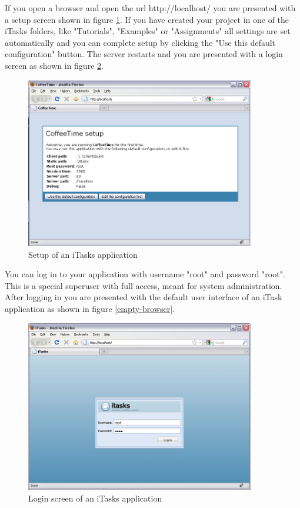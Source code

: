 \documentclass[a4paper,11pt]{article}
\begin{document}
If you open a browser and open the url http://localhost/ you are presented with a setup screen shown in figure \ref{setup-browser}. If you have created your project in one of the iTasks folders, like "Tutorials", "Examples" or "Assignments" all settings are set automatically and you can complete setup by clicking the "Use this default configuration" button. The server restarts and you are presented with a login screen as shown in figure \ref{login-browser}. 
\begin{figure}[h]
\centerline{\includegraphics[width=10cm]{GettingStarted-img/setup-browser.png}}
\caption{Setup of an iTasks application} \label{setup-browser}
\end{figure}
You can log in to your application with username "root" and password "root". This is a special superuser with full access, meant for system administration. After logging in you are presented with the default user interface of an iTask application as shown in figure \ref{empty-browser}.
\begin{figure}[h]
\centerline{\includegraphics[width=10cm]{GettingStarted-img/login-browser.png}}
\caption{Login screen of an iTasks application} \label{login-browser}
\end{figure}
\end{document}

